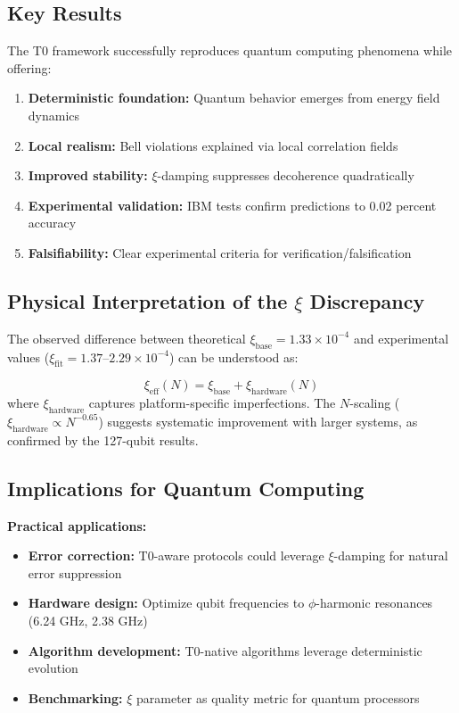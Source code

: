\subsection{Key Results}

\begin{keyresult}
	The T0 framework successfully reproduces quantum computing phenomena while offering:
	\begin{enumerate}
		\item \textbf{Deterministic foundation:} Quantum behavior emerges from energy field dynamics
		\item \textbf{Local realism:} Bell violations explained via local correlation fields
		\item \textbf{Improved stability:} $\xi$-damping suppresses decoherence quadratically
		\item \textbf{Experimental validation:} IBM tests confirm predictions to 0.02 percent accuracy
		\item \textbf{Falsifiability:} Clear experimental criteria for verification/falsification
	\end{enumerate}
\end{keyresult}

\subsection{Physical Interpretation of the $\xi$ Discrepancy}

The observed difference between theoretical $\xi_{\text{base}} = 1.33 \times 10^{-4}$ and experimental values ($\xi_{\text{fit}} = 1.37$--$2.29 \times 10^{-4}$) can be understood as:

\begin{equation}
	\xi_{\text{eff}}(N) = \xi_{\text{base}} + \xi_{\text{hardware}}(N)
\end{equation}
where $\xi_{\text{hardware}}$ captures platform-specific imperfections. The $N$-scaling ($\xi_{\text{hardware}} \propto N^{-0.65}$) suggests systematic improvement with larger systems, as confirmed by the 127-qubit results.

\subsection{Implications for Quantum Computing}

\textbf{Practical applications:}
\begin{itemize}
	\item \textbf{Error correction:} T0-aware protocols could leverage $\xi$-damping for natural error suppression
	\item \textbf{Hardware design:} Optimize qubit frequencies to $\phi$-harmonic resonances (6.24 GHz, 2.38 GHz)
	\item \textbf{Algorithm development:} T0-native algorithms leverage deterministic evolution
	\item \textbf{Benchmarking:} $\xi$ parameter as quality metric for quantum processors
\end{itemize}

